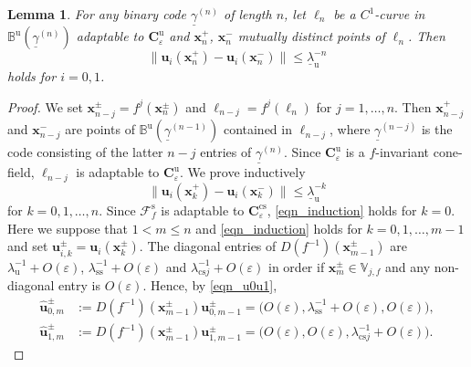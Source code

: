 \documentclass{amsart}
\newtheorem{lem}[thm]{Lemma}
\theoremstyle{definition}
\numberwithin{equation}{section}
\numberwithin{figure}{section}
\begin{document}
 

\begin{lem}\label{l_omega_k}
For any binary code $\underline{\gamma}^{(n)}$ of length $n$, let $\ell_n$ 
be a $C^1$-curve in $\mathbb{B}^{\mathrm{u}}(\underline{\gamma}^{(n)})$ adaptable to 
$\boldsymbol{C}_{\varepsilon}^{\mathrm{u}}$ and 
$\boldsymbol{x}_n^+$, $\boldsymbol{x}_n^-$ mutually distinct points of $\ell_n$.
Then 
$$\|\boldsymbol{u}_i(\boldsymbol{x}_n^+)-\boldsymbol{u}_i(\boldsymbol{x}_n^-)\|\leq \underline{\lambda}_{\mathrm{u}}^{-n}$$ 
holds for $i=0,1$.
\end{lem}
\begin{proof}
We set $\boldsymbol{x}_{n-j}^\pm=f^j(\boldsymbol{x}_n^\pm)$ and $\ell_{n-j}=f^j(\ell_n)$ for $j=1,\dots,n$.
Then $\boldsymbol{x}_{n-j}^+$ and $\boldsymbol{x}_{n-j}^-$ are points of $\mathbb{B}^{\mathrm{u}}(\underline{\gamma}^{(n-1)})$ contained in 
$\ell_{n-j}$, where $\underline{\gamma}^{(n-j)}$ is the code consisting of 
the latter $n-j$ entries of $\underline{\gamma}^{(n)}$.
Since $\boldsymbol{C}_{\varepsilon}^{\mathrm{u}}$ is a $f$-invariant cone-field, $\ell_{n-j}$ is adaptable to $\boldsymbol{C}_{\varepsilon}^{\mathrm{u}}$.
We prove inductively 
\begin{equation}\label{eqn_induction}
\|\boldsymbol{u}_i(\boldsymbol{x}_k^+)-\boldsymbol{u}_i(\boldsymbol{x}_k^-)\|\leq \underline{\lambda}_{\mathrm{u}}^{-k}
\end{equation}
for $k=0,1,\dots,n$.
Since $\mathcal{F}_f^{\mathrm{s}}$ is adaptable to $\boldsymbol{C}_{\varepsilon}^{\mathrm{cs}}$, \eqref{eqn_induction} holds 
for $k=0$.
Here we suppose that $1<m\leq n$ and \eqref{eqn_induction} holds for $k=0,1,\dots,m-1$ and 
set $\boldsymbol{u}_{i,k}^\pm=\boldsymbol{u}_i(\boldsymbol{x}_k^\pm)$.
The diagonal entries of $D(f^{-1})(\boldsymbol{x}_{m-1}^\pm)$ are $\lambda_{\mathrm{u}}^{-1}+O(\varepsilon)$, $\lambda_{\mathrm{ss}}^{-1}+O(\varepsilon)$ and 
$\lambda_{\mathrm{cs} j}^{-1}+O(\varepsilon)$ in order if $\boldsymbol{x}_m^\pm\in \mathbb{V}_{j,f}$ and any non-diagonal entry is $O(\varepsilon)$.
Hence, by \eqref{eqn_u0u1}, 
\begin{align*}
\widehat{\boldsymbol{u}}_{0,m}^\pm &:=D(f^{-1})(\boldsymbol{x}_{m-1}^\pm)\boldsymbol{u}_{0,m-1}^\pm=\bigl(O(\varepsilon),\lambda_{\mathrm{ss}}^{-1}+O(\varepsilon),O(\varepsilon)\bigr),\\
\widehat{\boldsymbol{u}}_{1,m}^\pm &:=D(f^{-1})(\boldsymbol{x}_{m-1}^\pm)\boldsymbol{u}_{1,m-1}^\pm=\bigl(O(\varepsilon),O(\varepsilon),\lambda_{\mathrm{cs} j}^{-1}+O(\varepsilon)\bigr).
\end{align*}

\end{proof}
\end{document}
